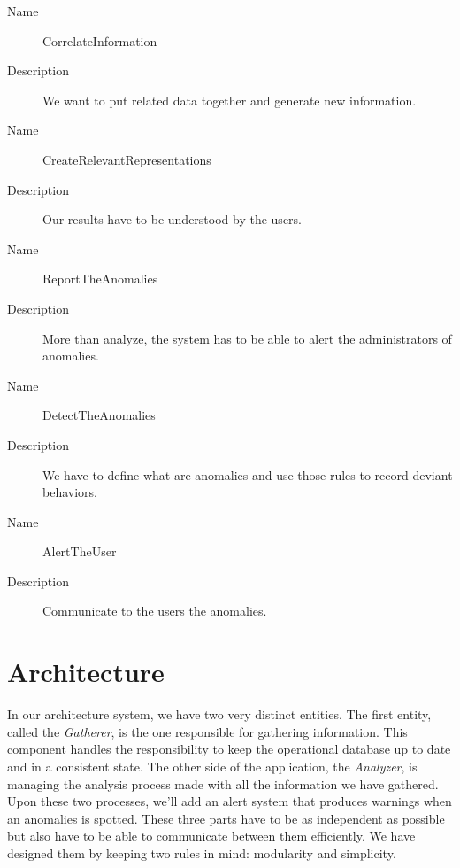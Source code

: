 \begin{description}
  \item[Name] CorrelateInformation
  \item[Description] We want to put related data together and generate new information.
\end{description}

\begin{description}
  \item[Name] CreateRelevantRepresentations
  \item[Description] Our results have to be understood by the users.
\end{description}

\begin{description}
  \item[Name] ReportTheAnomalies
  \item[Description] More than analyze, the system has to be able to alert the administrators of anomalies.
\end{description}

\begin{description}
  \item[Name] DetectTheAnomalies
  \item[Description] We have to define what are anomalies and use those rules to record deviant behaviors.
\end{description}

\begin{description}
  \item[Name] AlertTheUser
  \item[Description] Communicate to the users the anomalies.
\end{description}

\section{Architecture}
In our architecture system, we have two very distinct entities. The first entity, called the \textit{Gatherer}, is the one responsible for gathering information. This component handles the responsibility to keep the operational database up to date and in a consistent state. The other side of the application, the \textit{Analyzer}, is managing the analysis process made with all the information we have gathered. Upon these two processes, we'll add an alert system that produces warnings when an anomalies is spotted. These three parts have to be as independent as possible but also have to be able to communicate between them efficiently. We have designed them by keeping two rules in mind: modularity and simplicity.

